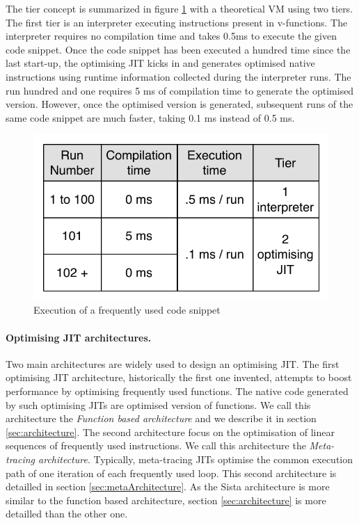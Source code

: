 \documentclass[a4paper,12pt,twoside]{../includes/ThesisStyle}
\begin{document}
The tier concept is summarized in figure \ref{fig:GeneralTieredArchitecture} with a theoretical VM using two tiers. The first tier is an interpreter executing instructions present in v-functions. The interpreter requires no compilation time and takes 0.5ms to execute the given code snippet. Once the code snippet has been executed a hundred time since the last start-up, the optimising JIT kicks in and generates optimised native instructions using runtime information collected during the interpreter runs. The run hundred and one requires 5 ms of compilation time to generate the optimised version. However, once the optimised version is generated, subsequent runs of the same code snippet are much faster, taking 0.1 ms instead of 0.5 ms.

\begin{figure}[h!]
    \begin{center}
        \includegraphics[width=0.5\linewidth]{GeneralTieredArchitecture}
        \caption{Execution of a frequently used code snippet}
        \label{fig:GeneralTieredArchitecture}
    \end{center}
\end{figure}

\paragraph{Optimising JIT architectures.} Two main architectures are widely used to design an optimising JIT. The first optimising JIT architecture, historically the first one invented, attempts to boost performance by optimising frequently used functions. The native code generated by such optimising JITs are optimised version of functions. We call this architecture the \emph{Function based architecture} and we describe it in section \ref{sec:architecture}. The second architecture focus on the optimisation of linear sequences of frequently used instructions. We call this architecture the \emph{Meta-tracing architecture}. Typically, meta-tracing JITs optimise the common execution path of one iteration of each frequently used loop. This second architecture is detailled in section \ref{sec:metaArchitecture}. As the Sista architecture is more similar to the function based architecture, section \ref{sec:architecture} is more detailled than the other one.
\end{document}
